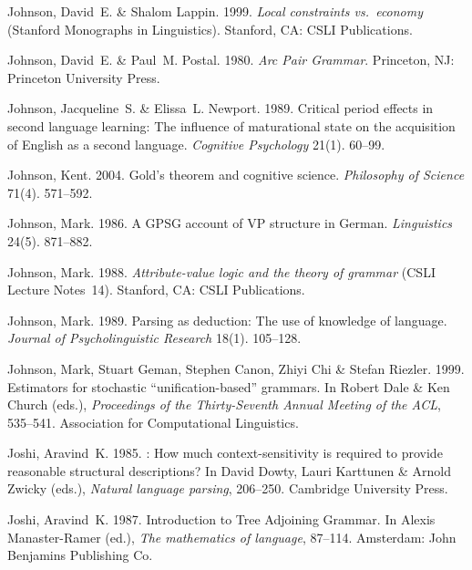\begin{thebibliography}{1420}
Johnson, David~E. \& Shalom Lappin. 1999.
\newblock \emph{Local constraints vs.\ economy}  (Stanford Monographs in
  Linguistics).
\newblock Stanford, CA: CSLI Publications.

Johnson, David~E. \& Paul~M. Postal. 1980.
\newblock \emph{{Arc Pair Grammar}}.
\newblock Princeton, NJ: Princeton University Press.

Johnson, Jacqueline~S. \& Elissa~L. Newport. 1989.
\newblock Critical period effects in second language learning: {The} influence
  of maturational state on the acquisition of {English} as a second language.
\newblock \emph{Cognitive Psychology} 21(1). 60--99.

Johnson, Kent. 2004.
\newblock Gold's theorem and cognitive science.
\newblock \emph{Philosophy of Science} 71(4). 571--592.

Johnson, Mark. 1986.
\newblock A {GPSG} account of {VP} structure in {German}.
\newblock \emph{Linguistics} 24(5). 871--882.

Johnson, Mark. 1988.
\newblock \emph{Attribute-value logic and the theory of grammar} (CSLI Lecture
  Notes~14).
\newblock Stanford, CA: CSLI Publications.

Johnson, Mark. 1989.
\newblock Parsing as deduction: {The} use of knowledge of language.
\newblock \emph{Journal of Psycholinguistic Research} 18(1). 105--128.

Johnson, Mark, Stuart Geman, Stephen Canon, Zhiyi Chi \& Stefan Riezler. 1999.
\newblock Estimators for stochastic ``unification-based'' grammars.
\newblock In Robert Dale \& Ken Church (eds.), \emph{Proceedings of the
  {Thirty-Seventh Annual Meeting of the ACL}}, 535--541. Association for
  Computational Linguistics.

Joshi, Aravind~K. 1985.
: {How} much context-sensitivity is required
  to provide reasonable structural descriptions?
\newblock In David Dowty, Lauri Karttunen \& Arnold Zwicky (eds.),
  \emph{Natural language parsing}, 206--250. Cambridge University Press.

Joshi, Aravind~K. 1987{}.
\newblock Introduction to {Tree Adjoining Grammar}.
\newblock In Alexis Manaster-Ramer (ed.), \emph{The mathematics of language},
  87--114. Amsterdam: John Benjamins Publishing Co.


\end{thebibliography}
